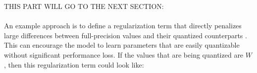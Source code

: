 %

THIS PART WILL GO TO THE NEXT SECTION:
\\
\\
An example approach is to define a regularization term that directly penalizes large differences between full-precision values 
and their quantized counterparts \cite{zhuang2018towards}. This can encourage the model to learn parameters that are easily quantizable without significant performance loss.
If the values that are being quantized are \( W \), then this regularization term could look like:

